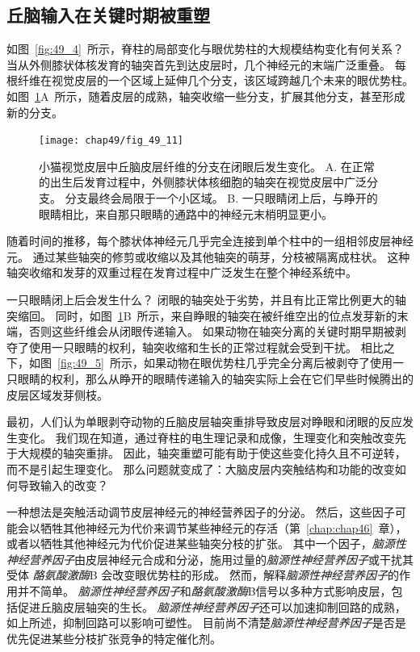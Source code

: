 \subsection{丘脑输入在关键时期被重塑}

如图~\ref{fig:49_4}~所示，脊柱的局部变化与眼优势柱的大规模结构变化有何关系？
当从外侧膝状体核发育的轴突首先到达皮层时，几个神经元的末端广泛重叠。
每根纤维在视觉皮层的一个区域上延伸几个分支，该区域跨越几个未来的眼优势柱。
如图~\ref{fig:49_11}A~所示，随着皮层的成熟，轴突收缩一些分支，扩展其他分支，甚至形成新的分支。


\begin{figure}[htbp]
	\centering
	\texttt{[image: chap49/fig\_49\_11]}
	\caption{小猫视觉皮层中丘脑皮层纤维的分支在闭眼后发生变化\cite{antonini1993rapid}。
		A. 在正常的出生后发育过程中，外侧膝状体核细胞的轴突在视觉皮层中广泛分支。
		分支最终会局限于一个小区域。
		B. 一只眼睛闭上后，与睁开的眼睛相比，来自那只眼睛的通路中的神经元末梢明显更小。}
	\label{fig:49_11}
\end{figure}


随着时间的推移，每个膝状体神经元几乎完全连接到单个柱中的一组相邻皮层神经元。
通过某些轴突的修剪或收缩以及其他轴突的萌芽，分枝被隔离成柱状。
这种轴突收缩和发芽的双重过程在发育过程中广泛发生在整个神经系统中。


一只眼睛闭上后会发生什么？
闭眼的轴突处于劣势，并且有比正常比例更大的轴突缩回。
同时，如图~\ref{fig:49_11}B~所示，来自睁眼的轴突在被纤维空出的位点发芽新的末端，否则这些纤维会从闭眼传递输入。
如果动物在轴突分离的关键时期早期被剥夺了使用一只眼睛的权利，轴突收缩和生长的正常过程就会受到干扰。
相比之下，如图~\ref{fig:49_5}~所示，如果动物在眼优势柱几乎完全分离后被剥夺了使用一只眼睛的权利，那么从睁开的眼睛传递输入的轴突实际上会在它们早些时候腾出的皮层区域发芽侧枝。


最初，人们认为单眼剥夺动物的丘脑皮层轴突重排导致皮层对睁眼和闭眼的反应发生变化。
我们现在知道，通过脊柱的电生理记录和成像，生理变化和突触改变先于大规模的轴突重排。
因此，轴突重塑可能有助于使这些变化持久且不可逆转，而不是引起生理变化。
那么问题就变成了：大脑皮层内突触结构和功能的改变如何导致输入的改变？


一种想法是突触活动调节皮层神经元的神经营养因子的分泌。
然后，这些因子可能会以牺牲其他神经元为代价来调节某些神经元的存活（第~\ref{chap:chap46}~章），或者以牺牲其他神经元为代价促进某些轴突分枝的扩张。
其中一个因子，\textit{脑源性神经营养因子}由皮层神经元合成和分泌，施用过量的\textit{脑源性神经营养因子}或干扰其受体 \textit{酪氨酸激酶}B 会改变眼优势柱的形成。
然而，解释\textit{脑源性神经营养因子}的作用并不简单。
\textit{脑源性神经营养因子}和\textit{酪氨酸激酶}B信号以多种方式影响皮层，包括促进丘脑皮层轴突的生长。
\textit{脑源性神经营养因子}还可以加速抑制回路的成熟，如上所述，抑制回路可以影响可塑性。
目前尚不清楚\textit{脑源性神经营养因子}是否是优先促进某些分枝扩张竞争的特定催化剂。



